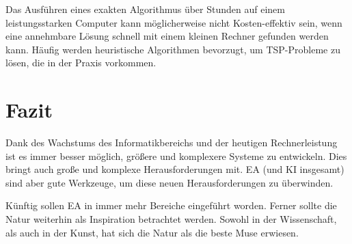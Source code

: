 \documentclass[twoside,twocolumn]{article}
\begin{document}
Das Ausführen eines exakten Algorithmus über Stunden auf einem leistungsstarken Computer kann möglicherweise nicht Kosten-effektiv sein, wenn eine annehmbare Lösung schnell mit einem kleinen Rechner gefunden werden kann. Häufig werden heuristische Algorithmen bevorzugt, um TSP-Probleme zu lösen, die in der Praxis vorkommen.



\section{Fazit}
Dank des Wachstums des Informatikbereichs und der heutigen Rechnerleistung ist es immer besser möglich, größere und komplexere Systeme zu entwickeln. Dies bringt auch große und komplexe Herausforderungen mit. EA (und KI insgesamt) sind aber gute Werkzeuge, um diese neuen Herausforderungen zu überwinden.\par
Künftig sollen EA in immer mehr Bereiche eingeführt worden. Ferner sollte die Natur weiterhin als Inspiration betrachtet werden. Sowohl in der Wissenschaft, als auch in der Kunst, hat sich die Natur als die beste Muse erwiesen.


\renewcommand{\refname}{Quellenverzeichnis}




\end{document}
